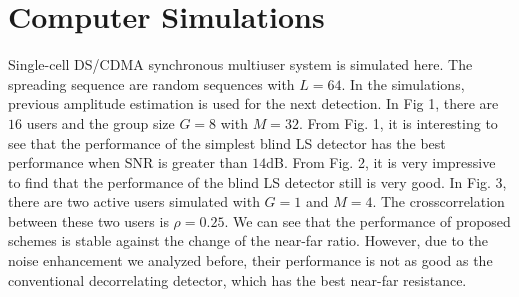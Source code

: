 \documentclass[conference]{IEEEtran}
\begin{document}
\section{Computer Simulations}

\begin{figure} \label{BER}
\end{figure}

\begin{figure} \label{BER}
\end{figure}


Single-cell DS/CDMA synchronous multiuser system is simulated
here. The spreading sequence are random sequences with $L=64$. In
the simulations, previous amplitude estimation is used for the
next detection. In Fig 1, there are $16$ users and the group size
$G=8$ with $M=32$. From Fig. 1, it is interesting to see that the
performance of the simplest blind LS detector has the best
performance when SNR is greater than $14$dB. From Fig. 2, it is
very impressive to find that the performance of the blind LS
detector still is very good. In Fig. 3, there are two active users
simulated with $G=1$ and $M=4$. The crosscorrelation between these
two users is $\rho=0.25$. We can see that the performance of
proposed schemes is stable against the change of the near-far
ratio. However, due to the noise enhancement we analyzed before,
their performance is not as good as the conventional decorrelating
detector, which has the best near-far resistance.
\end{document}
